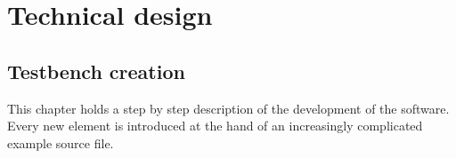 
\chapter{Technical design} \label{TD}
\section{Testbench creation}
This chapter holds a step by step description of the development of the software. Every new element is introduced at the hand of an increasingly complicated example source file.
